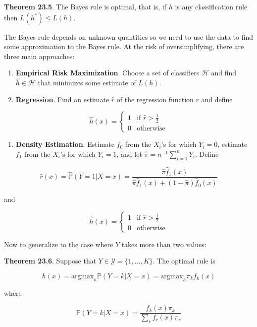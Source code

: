 \textbf{Theorem 23.5}. The Bayes rule is optimal, that is, if \(h\) is
any classification rule then \(L(h^*) \leq L(h)\).

The Bayes rule depends on unknown quantities so we need to use the data
to find some approximation to the Bayes rule. At the risk of
oversimplifying, there are three main approaches:

\begin{enumerate}
\def\labelenumi{\arabic{enumi}.}
\item
  \textbf{Empirical Risk Maximization}. Choose a set of classifiers
  \(\mathcal{H}\) and find \(\hat{h} \in \mathcal{H}\) that minimizes
  some estimate of \(L(h)\).
\item
  \textbf{Regression}. Find an estimate \(\hat{r}\) of the regression
  function \(r\) and define
\end{enumerate}

\[ 
\hat{h}(x) = \begin{cases}
1 & \text{if } \hat{r} > \frac{1}{2} \\
0 & \text{otherwise}
\end{cases}
\]

\begin{enumerate}[tightlist,label={\arabic*.},resume]
\item
  \textbf{Density Estimation}. Estimate \(f_0\) from the \(X_i\)'s for
  which \(Y_i = 0\), estimate \(f_1\) from the \(X_i\)'s for which
  \(Y_i = 1\), and let \(\hat{\pi} = n^{-1} \sum_{i=1}^n Y_i\). Define
\end{enumerate}

\[ \hat{r}(x) = \hat{\mathbb{P}}(Y = 1 | X = x) = \frac{\hat{\pi} \hat{f}_1(x)}{\hat{\pi} \hat{f}_1(x) + (1 - \hat{\pi}) \hat{f}_0(x)} \]

and

\[ 
\hat{h}(x) = \begin{cases}
1 & \text{if } \hat{r} > \frac{1}{2} \\
0 & \text{otherwise}
\end{cases}
\]

Now to generalize to the case where \(Y\) takes more than two values:

\textbf{Theorem 23.6}. Suppose that
\(Y \in \mathcal{Y} = \{ 1, \dots, K \}\). The optimal rule is

\[ h(x) = \text{argmax}_h \mathbb{P}(Y = k | X = x) = \text{argmax}_h \pi_k f_k(x) \]

where

\[ \mathbb{P}(Y = k | X = x) = \frac{f_k(x) \pi_k}{\sum_r f_r(x) \pi_r} \]

